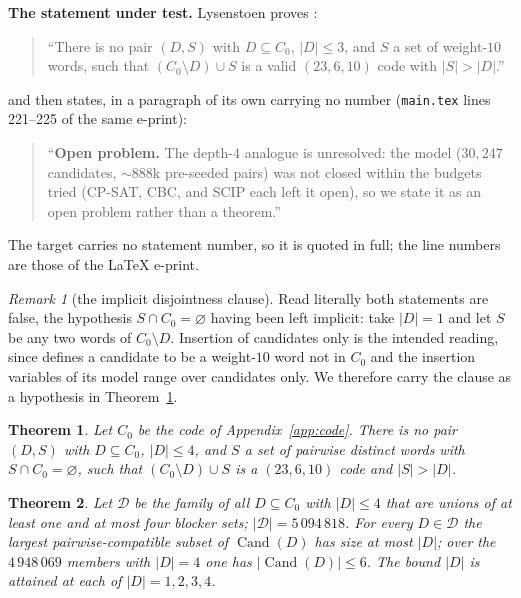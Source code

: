 \documentclass[11pt]{amsart}
\newtheorem{theorem}{Theorem}
\theoremstyle{remark}
\newtheorem*{remark}{Remark}
\DeclareMathOperator{\Cand}{Cand}
\begin{document}
\medskip
\noindent\textbf{The statement under test.}
Lysenstoen proves \cite[the depth-$3$ theorem, \texttt{main.tex} lines 196--200 of
\texttt{arXiv:2607.19550v1}]{Lys}:
\begin{quote}
``There is no pair $(D,S)$ with $D\subseteq C_0$, $|D|\le 3$, and $S$ a set of weight-$10$
words, such that $(C_0\setminus D)\cup S$ is a valid $(23,6,10)$ code with $|S|>|D|$.''
\end{quote}
and then states, in a paragraph of its own carrying no number
(\texttt{main.tex} lines 221--225 of the same e-print):
\begin{quote}
``\textbf{Open problem.} The depth-$4$ analogue is unresolved: the model ($30{,}247$
candidates, ${\sim}888$k pre-seeded pairs) was not closed within the budgets tried (CP-SAT,
CBC, and SCIP each left it open), so we state it as an open problem rather than a theorem.''
\end{quote}
The target carries no statement number, so it is quoted in full; the line numbers are those of
the \LaTeX{} e-print.

\begin{remark}[the implicit disjointness clause]\label{rem:wlog}
Read literally both statements are false, the hypothesis $S\cap C_0=\varnothing$ having been
left implicit: take $|D|=1$ and let $S$ be any two words of $C_0\setminus D$. Insertion of
candidates only is the intended reading, since \cite{Lys} defines a candidate to be a
weight-$10$ word not in $C_0$ and the insertion variables of its model range over candidates
only. We therefore carry the clause as a hypothesis in Theorem~\ref{thm:main}.
\end{remark}

\begin{theorem}\label{thm:main}
Let $C_0$ be the code of Appendix~\ref{app:code}. There is no pair $(D,S)$ with
$D\subseteq C_0$, $|D|\le 4$, and $S$ a set of pairwise distinct words with
$S\cap C_0=\varnothing$, such that $(C_0\setminus D)\cup S$ is a $(23,6,10)$ code and
$|S|>|D|$.
\end{theorem}

\begin{theorem}\label{thm:sharp}
Let $\mathcal D$ be the family of all $D\subseteq C_0$ with $|D|\le 4$ that are unions of at
least one and at most four blocker sets; $|\mathcal D|=5\,094\,818$. For every $D\in\mathcal D$ the largest
pairwise-compatible subset of $\Cand(D)$ has size at most $|D|$; over the $4\,948\,069$
members with $|D|=4$ one has $|\Cand(D)|\le 6$. The bound $|D|$ is attained at each of
$|D|=1,2,3,4$.
\end{theorem}
\end{document}
